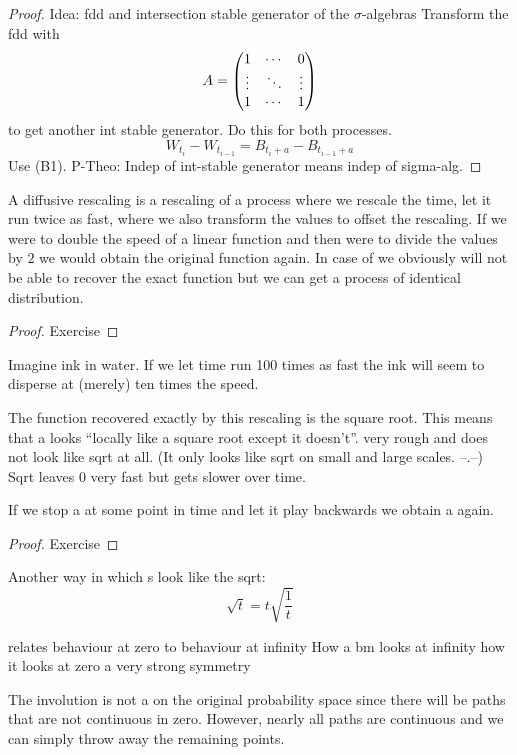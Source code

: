 \begin{proof}
	Idea: fdd and intersection stable generator of the \(\sigma\)-algebras
	Transform the fdd with \[A = \begin{pmatrix} 1 & \cdots & 0\\ \vdots & \ddots & \vdots\\ 1 & \cdots & 1 \end{pmatrix}\]
	to get another int stable generator.
	Do this for both processes.
	\[W_{t_i}-W_{t_{i-1}} = B_{t_i+a}-B_{t_{i-1}+a}\]
	Use (B1).
	P-Theo: Indep of int-stable generator means indep of sigma-alg.
\end{proof}

A diffusive rescaling is a rescaling of a process
where we rescale the time,
\eg let it run twice as fast,
where we also transform the values to offset the rescaling.
If we were to double the speed of a linear function
and then were to divide the values by \(2\)
we would obtain the original function again.
In case of \BM we obviously will not be able to recover the exact function
but we can get a process of identical distribution.

\begin{prop}
\end{prop}

\begin{proof} Exercise\end{proof}

Imagine ink in water.
If we let time run 100 times as fast
the ink will seem to disperse at (merely) ten times the speed.

The function recovered exactly by this rescaling is the square root.
This means that a \BM looks “locally like a square root except it doesn't”.
\BM very rough and does not look like sqrt at all.
(It only looks like sqrt on small and large scales. –.–)
Sqrt leaves \(0\) very fast but gets slower over time.

If we stop a \BM at some point in time
and let it play backwards
we obtain a \BM again.

\begin{prop}
\end{prop}
\begin{proof} Exercise\end{proof}

Another way in which \BM s look like the sqrt:
\[\sqrt t = t\sqrt{\frac1t}\]

relates behaviour at zero to behaviour at infinity
How a bm looks at infinity how it looks at zero
a very strong symmetry

The involution is not a \BM on the original probability space
since there will be paths that are not continuous in zero.
However, nearly all paths are continuous
and we can simply throw away the remaining points.

